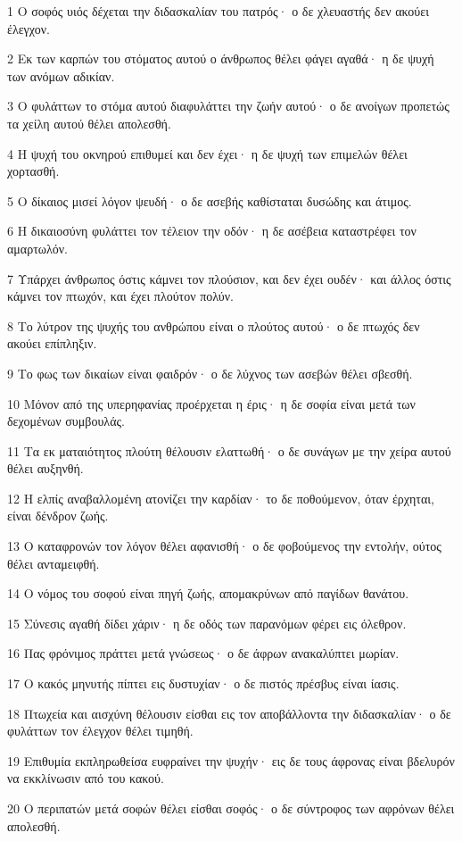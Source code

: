 \par 1 Ο σοφός υιός δέχεται την διδασκαλίαν του πατρός· ο δε χλευαστής δεν ακούει έλεγχον.
\par 2 Εκ των καρπών του στόματος αυτού ο άνθρωπος θέλει φάγει αγαθά· η δε ψυχή των ανόμων αδικίαν.
\par 3 Ο φυλάττων το στόμα αυτού διαφυλάττει την ζωήν αυτού· ο δε ανοίγων προπετώς τα χείλη αυτού θέλει απολεσθή.
\par 4 Η ψυχή του οκνηρού επιθυμεί και δεν έχει· η δε ψυχή των επιμελών θέλει χορτασθή.
\par 5 Ο δίκαιος μισεί λόγον ψευδή· ο δε ασεβής καθίσταται δυσώδης και άτιμος.
\par 6 Η δικαιοσύνη φυλάττει τον τέλειον την οδόν· η δε ασέβεια καταστρέφει τον αμαρτωλόν.
\par 7 Υπάρχει άνθρωπος όστις κάμνει τον πλούσιον, και δεν έχει ουδέν· και άλλος όστις κάμνει τον πτωχόν, και έχει πλούτον πολύν.
\par 8 Το λύτρον της ψυχής του ανθρώπου είναι ο πλούτος αυτού· ο δε πτωχός δεν ακούει επίπληξιν.
\par 9 Το φως των δικαίων είναι φαιδρόν· ο δε λύχνος των ασεβών θέλει σβεσθή.
\par 10 Μόνον από της υπερηφανίας προέρχεται η έρις· η δε σοφία είναι μετά των δεχομένων συμβουλάς.
\par 11 Τα εκ ματαιότητος πλούτη θέλουσιν ελαττωθή· ο δε συνάγων με την χείρα αυτού θέλει αυξηνθή.
\par 12 Η ελπίς αναβαλλομένη ατονίζει την καρδίαν· το δε ποθούμενον, όταν έρχηται, είναι δένδρον ζωής.
\par 13 Ο καταφρονών τον λόγον θέλει αφανισθή· ο δε φοβούμενος την εντολήν, ούτος θέλει ανταμειφθή.
\par 14 Ο νόμος του σοφού είναι πηγή ζωής, απομακρύνων από παγίδων θανάτου.
\par 15 Σύνεσις αγαθή δίδει χάριν· η δε οδός των παρανόμων φέρει εις όλεθρον.
\par 16 Πας φρόνιμος πράττει μετά γνώσεως· ο δε άφρων ανακαλύπτει μωρίαν.
\par 17 Ο κακός μηνυτής πίπτει εις δυστυχίαν· ο δε πιστός πρέσβυς είναι ίασις.
\par 18 Πτωχεία και αισχύνη θέλουσιν είσθαι εις τον αποβάλλοντα την διδασκαλίαν· ο δε φυλάττων τον έλεγχον θέλει τιμηθή.
\par 19 Επιθυμία εκπληρωθείσα ευφραίνει την ψυχήν· εις δε τους άφρονας είναι βδελυρόν να εκκλίνωσιν από του κακού.
\par 20 Ο περιπατών μετά σοφών θέλει είσθαι σοφός· ο δε σύντροφος των αφρόνων θέλει απολεσθή.

